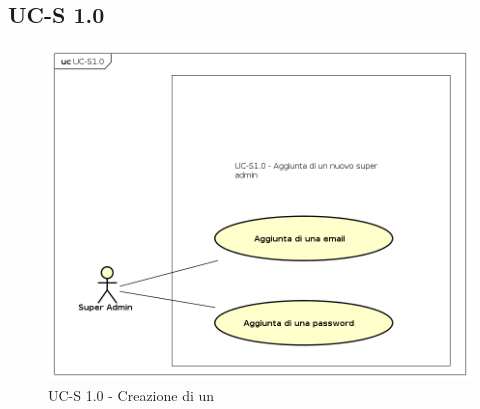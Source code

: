 \subsection{UC-S 1.0}
    \begin{figure}[H]
      \begin{center}
        \includegraphics[width=12cm]{res/img/UCSuperadmin/UCS1.0.png}
      \caption{UC-S 1.0 - Creazione di un }
      \end{center} 
    \end{figure}    
    
